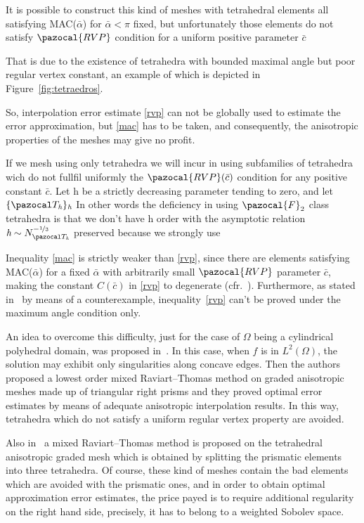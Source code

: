 It is possible to construct this
kind of meshes with tetrahedral elements all satisfying MAC($\bar\alpha$) for 
$\bar\alpha<\pi$ fixed, but unfortunately those 
elements do not satisfy $\pazocal{RVP}$ condition for a uniform positive parameter
$\bar{c}$

That is 
due to the existence of tetrahedra with bounded 
maximal angle but poor regular vertex constant, an example of which is 
depicted in Figure~\ref{fig:tetraedros}. 

So, interpolation error estimate \eqref{rvp} 
can not be globally used to estimate the error approximation, but \eqref{mac} has to be taken, and consequently, 
the anisotropic properties of the meshes may give no profit.  

If we mesh using only tetrahedra we will incur in using subfamilies of tetrahedra
wich do not fullfil uniformly the $\pazocal{RVP}(\bar c)$ condition for any positive constant $\bar c$.
Let $\textit{h}$ be a strictly decreasing parameter tending to zero, 
and let $\{\Th\}_{\textit{h}}$
In other words the deficiency in using $\pazocal{F}_2$ class tetrahedra
is that we don't
have $\textit{h}$ order with the asymptotic relation 
$\textit{h}\sim N_{\Th}^{-\nicefrac13}$ preserved because we strongly use




Inequality \eqref{mac} is strictly weaker than \eqref{rvp}, since there are elements 
satisfying MAC($\bar\alpha$) for a fixed $\bar\alpha$ with arbitrarily 
small $\pazocal{RVP}$ parameter $\bar c$, making the constant $C(\bar c)$ in \eqref{rvp} 
to degenerate  
(cfr.~\cite{aadl}). Furthermore,
as stated 
in~\cite{aadl} by means of a counterexample, 
inequality~\eqref{rvp} can't be proved under the maximum angle condition only. 

\tetsTikz

An idea to overcome this difficulty, just for the case of $\Omega$ being a 
cylindrical polyhedral domain, 
was proposed in~\cite{MR1866274}. In  this case, when $f$ is in $L^2(\Omega)$, 
the solution may exhibit only singularities along concave edges.
Then the authors proposed a lowest order mixed Raviart--Thomas method on graded 
anisotropic meshes made up of triangular right prisms and they proved optimal error 
estimates by means of adequate anisotropic interpolation results. 
In this way, tetrahedra which do not satisfy a
uniform regular vertex property are avoided.

Also in~\cite{MR1866274} a mixed Raviart--Thomas method is 
proposed on the tetrahedral 
anisotropic graded mesh which is obtained by splitting the prismatic elements 
into three tetrahedra. Of course, these kind of meshes contain the bad elements 
which are avoided with the prismatic ones, and in order to obtain optimal 
approximation error estimates, the price payed is to require additional regularity 
on the right hand side, precisely, it has to belong to a weighted Sobolev space.

